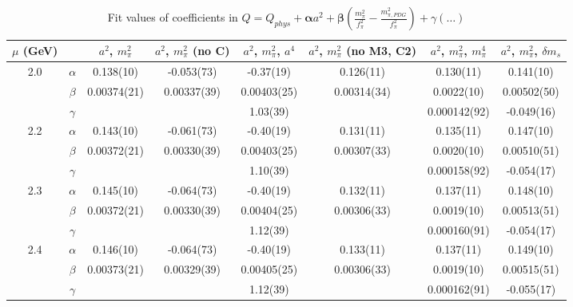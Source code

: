 \documentclass[12pt]{extarticle}
\begin{document}
\begin{table}[h!]
\begin{center}
\begin{tabular}{|c c|c|c|c|c|c|c|}
\hline
$\mu$ (GeV) &  & $a^2$, $m_\pi^2$& $a^2$, $m_\pi^2$ (no C)& $a^2$, $m_\pi^2$, $a^4$& $a^2$, $m_\pi^2$ (no M3, C2)& $a^2$, $m_\pi^2$, $m_\pi^4$& $a^2$, $m_\pi^2$, $\delta m_s$\\
\hline
\multirow{3}{0.5in}{2.0} & $\alpha$ & 0.138(10)& -0.053(73)& -0.37(19)& 0.126(11)& 0.130(11)& 0.141(10)\\
 & $\beta$ & 0.00374(21)& 0.00337(39)& 0.00403(25)& 0.00314(34)& 0.0022(10)& 0.00502(50)\\
 & $\gamma$ &  &  & 1.03(39)&  & 0.000142(92)& -0.049(16)\\
\hline
\multirow{3}{0.5in}{2.2} & $\alpha$ & 0.143(10)& -0.061(73)& -0.40(19)& 0.131(11)& 0.135(11)& 0.147(10)\\
 & $\beta$ & 0.00372(21)& 0.00330(39)& 0.00403(25)& 0.00307(33)& 0.0020(10)& 0.00510(51)\\
 & $\gamma$ &  &  & 1.10(39)&  & 0.000158(92)& -0.054(17)\\
\hline
\multirow{3}{0.5in}{2.3} & $\alpha$ & 0.145(10)& -0.064(73)& -0.40(19)& 0.132(11)& 0.137(11)& 0.148(10)\\
 & $\beta$ & 0.00372(21)& 0.00330(39)& 0.00404(25)& 0.00306(33)& 0.0019(10)& 0.00513(51)\\
 & $\gamma$ &  &  & 1.12(39)&  & 0.000160(91)& -0.054(17)\\
\hline
\multirow{3}{0.5in}{2.4} & $\alpha$ & 0.146(10)& -0.064(73)& -0.40(19)& 0.133(11)& 0.137(11)& 0.149(10)\\
 & $\beta$ & 0.00373(21)& 0.00329(39)& 0.00405(25)& 0.00306(33)& 0.0019(10)& 0.00515(51)\\
 & $\gamma$ &  &  & 1.12(39)&  & 0.000162(91)& -0.055(17)\\
\hline
\end{tabular}
\caption{Fit values of coefficients in $Q = Q_{phys} + \mathbf{\alpha} a^2 + \mathbf{\beta}\left(\frac{m_\pi^2}{f_\pi^2}-\frac{m_{\pi,PDG}^2}{f_\pi^2}\right) + \gamma(\ldots)$}
\end{center}
\end{table}






\end{document}

